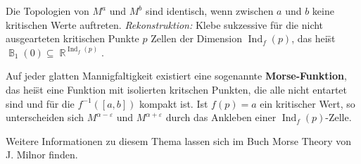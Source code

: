 \documentclass[paper=A4, twoside, chapterprefix=true, bibliography=totoc, headsepline]{scrbook}
\let\temp\phi{}
\let\phi\varphi{}
\let\varphi\temp{}
\let\temp\theta{}
\let\theta\vartheta{}
\let\vartheta\temp{}
\let\temp\epsilon{}
\let\epsilon\varepsilon{}
\let\varepsilon\temp{}
\let\temp\rho{}
\let\rho\varrho{}
\let\varrho\temp{}
\DeclareMathOperator{\R}{\mathbb{R}}
\DeclareMathOperator{\B}{\mathbb{B}} %
\DeclareMathOperator{\Ind}{Ind}     %
\theoremstyle{plain}
\theoremstyle{nonumberplain}
\theoremstyle{empty}
\theoremstyle{break}
\newcommand{\CmIndex}[2][]{\ifthenelse{\isempty{#1}}{\index{#2}}{\index{#1}}#2}
\newcommand{\CmMark}[2][]{\textbf{\CmIndex[#1]{#2}}}
\newcommand{\quot}[1]{\textrm{\glqq}{#1}\textrm{\grqq}}
\begin{document}
\begin{center}
\end{center}
Die Topologien von $M^a$ und $M^b$ sind identisch, wenn zwischen $a$ und $b$ keine kritischen Werte auftreten.
\emph{\quot{Rekonstruktion}:} Klebe sukzessive f\"ur die nicht ausgearteten kritischen Punkte $p$ Zellen der Dimension $\Ind_f(p)$, das hei\"st $\B_1(0) \subseteq \R^{\Ind_f(p)}$.


Auf jeder glatten Mannigfaltigkeit existiert eine sogenannte \CmMark{Morse-Funktion}, das hei\"st eine Funktion mit isolierten kritschen Punkten, die alle nicht entartet sind und für die $f^{-1}([a,b])$ kompakt ist.
Ist $f(p) = a$ ein kritischer Wert, so unterscheiden sich $M^{\alpha - \epsilon}$ und $M^{\alpha + \epsilon}$ durch das Ankleben einer $\Ind_f(p)$-Zelle.

Weitere Informationen zu diesem Thema lassen sich im Buch \quot{Morse Theory} von J. Milnor \cite{milnor1963morsetheo} finden.
\end{document}
